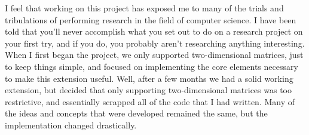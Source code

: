 \documentclass[a4paper,12pt]{article}
\newcommand{\tab}{\hspace*{2em}}
\begin{document}
\tab I feel that working on this project has exposed me to many of the trials and tribulations of performing research in the field of computer science.  I have been told that you'll never accomplish what you set out to do on a research project on your first try, and if you do, you probably aren't researching anything interesting.  When I first began the project, we only supported two-dimensional matrices, just to keep things simple, and focused on implementing the core elements necessary to make this extension useful.  Well, after a few months we had a solid working extension, but decided that only supporting two-dimensional matrices was too restrictive, and essentially scrapped all of the code that I had written.  Many of the ideas and concepts that were developed remained the same, but the implementation changed drastically.  \newline
\end{document}
